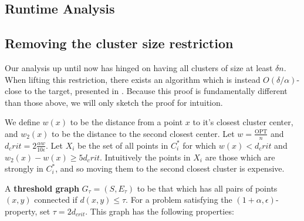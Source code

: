 \documentclass[paper=a4, fontsize=10.5pt]{scrartcl} %
\numberwithin{equation}{section} %
\numberwithin{figure}{section} %
\numberwithin{table}{section} %
\begin{document}

\subsection{Runtime Analysis}

\subsection{Removing the cluster size restriction}

Our analysis up until now has hinged on having all clusters of size at least $\delta n$. When lifting this restriction, there exists an algorithm which is instead $O(\delta/\alpha)$-close to the target, presented in \cite{firstpaper}. Because this proof is fundamentally different than those above, we will only sketch the proof for intuition. 

We define $w(x)$ to be the distance from a point $x$ to it's closest cluster center, and $w_2(x)$ to be the distance to the second closest center. Let $w = \frac{\text{OPT}}{n}$ and $d_crit = 2\frac{\alpha w}{10 \epsilon}$. Let $X_i$ be the set of all points in $C_i^*$ for which $w(x) < d_crit$ and $w_2(x) - w(x) \geq 5d_crit$. Intuitively the points in $X_i$ are those which are strongly in $C_i^*$, and so moving them to the second closest cluster is expensive.

A \textbf{threshold graph} $G_\tau = (S, E_\tau)$ to be that which has all pairs of points $(x, y)$ connected if $d(x, y) \leq \tau$. For a problem satisfying the $(1 + \alpha, \epsilon)$-property, set $\tau = 2d_{crit}$. This graph has the following properties:
\end{document}
